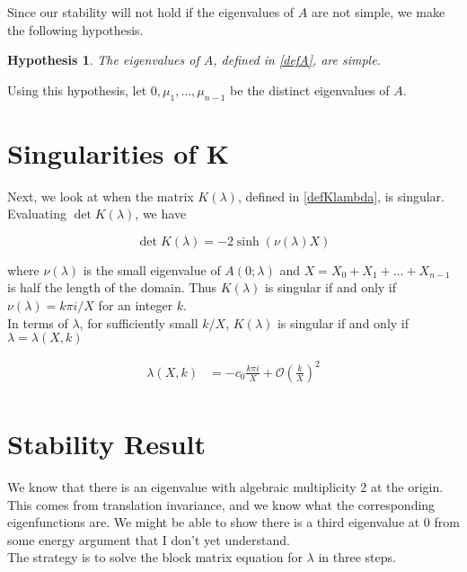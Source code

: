 \documentclass[12pt]{article}
\newtheorem{hypothesis}{Hypothesis}
\begin{document}
Since our stability will not hold if the eigenvalues of $A$ are not simple, we make the following hypothesis.

\begin{hypothesis}\label{Asimpleeigs}
The eigenvalues of $A$, defined in \eqref{defA}, are simple.
\end{hypothesis}

Using this hypothesis, let $0, \mu_1, \dots, \mu_{n-1}$ be the distinct eigenvalues of $A$.

\section{Singularities of K}

Next, we look at when the matrix $K(\lambda)$, defined in \eqref{defKlambda}, is singular. Evaluating $\det K(\lambda)$, we have

\begin{equation}
\det K(\lambda) = -2 \sinh( \nu(\lambda) X )
\end{equation}

where $\nu(\lambda)$ is the small eigenvalue of $A(0; \lambda)$ and $X = X_0 + X_1 + \dots + X_{n-1}$ is half the length of the domain. Thus $K(\lambda)$ is singular if and only if $\nu(\lambda) = k \pi i/X$ for an integer $k$. \\

In terms of $\lambda$, for sufficiently small $k/X$, $K(\lambda)$ is singular if and only if $\lambda = \lambda(X, k)$

\begin{align}\label{lambdaXk}
\lambda(X,k)
&= -c_0 \frac{k \pi i }{X} + \mathcal{O}\left(\frac{k}{X}\right)^2 \\
\end{align} 

\section{Stability Result}

We know that there is an eigenvalue with algebraic multiplicity 2 at the origin. This comes from translation invariance, and we know what the corresponding eigenfunctions are. We might be able to show there is a third eigenvalue at 0 from some energy argument that I don't yet understand.\\

The strategy is to solve the block matrix equation for $\lambda$ in three steps.
\end{document}
